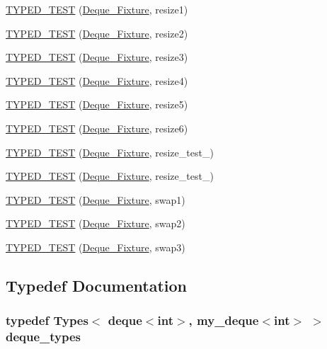 \begin{DoxyCompactItemize}
\item 
\hyperlink{TestDeque_8c_09_09_a4861cc7f4f1f2d8f90680487f8e4b6f4}{T\-Y\-P\-E\-D\-\_\-\-T\-E\-S\-T} (\hyperlink{structDeque__Fixture}{Deque\-\_\-\-Fixture}, resize1)
\item 
\hyperlink{TestDeque_8c_09_09_a4d1fd20f778de0be625788465b7ecbd3}{T\-Y\-P\-E\-D\-\_\-\-T\-E\-S\-T} (\hyperlink{structDeque__Fixture}{Deque\-\_\-\-Fixture}, resize2)
\item 
\hyperlink{TestDeque_8c_09_09_a43548d16dcb856e44d30ad9ebcefaa4f}{T\-Y\-P\-E\-D\-\_\-\-T\-E\-S\-T} (\hyperlink{structDeque__Fixture}{Deque\-\_\-\-Fixture}, resize3)
\item 
\hyperlink{TestDeque_8c_09_09_acef2b2b2ad033d418caca9d07a45c1ad}{T\-Y\-P\-E\-D\-\_\-\-T\-E\-S\-T} (\hyperlink{structDeque__Fixture}{Deque\-\_\-\-Fixture}, resize4)
\item 
\hyperlink{TestDeque_8c_09_09_a7db3e26540c8318a0c8e063def7848e7}{T\-Y\-P\-E\-D\-\_\-\-T\-E\-S\-T} (\hyperlink{structDeque__Fixture}{Deque\-\_\-\-Fixture}, resize5)
\item 
\hyperlink{TestDeque_8c_09_09_a636409bc2080e5b006d757a2e4959a3e}{T\-Y\-P\-E\-D\-\_\-\-T\-E\-S\-T} (\hyperlink{structDeque__Fixture}{Deque\-\_\-\-Fixture}, resize6)
\item 
\hyperlink{TestDeque_8c_09_09_a49393b148b2133863b6fd116f00868e7}{T\-Y\-P\-E\-D\-\_\-\-T\-E\-S\-T} (\hyperlink{structDeque__Fixture}{Deque\-\_\-\-Fixture}, resize\-\_\-test\-\_)
\item 
\hyperlink{TestDeque_8c_09_09_a75192a56be259b8bfb3b690f41015ac7}{T\-Y\-P\-E\-D\-\_\-\-T\-E\-S\-T} (\hyperlink{structDeque__Fixture}{Deque\-\_\-\-Fixture}, resize\-\_\-test\-\_)
\item 
\hyperlink{TestDeque_8c_09_09_a215253ea5c0cb1afcad6943cf7788c3e}{T\-Y\-P\-E\-D\-\_\-\-T\-E\-S\-T} (\hyperlink{structDeque__Fixture}{Deque\-\_\-\-Fixture}, swap1)
\item 
\hyperlink{TestDeque_8c_09_09_a899eb9ffe534295b28b0c274572def9e}{T\-Y\-P\-E\-D\-\_\-\-T\-E\-S\-T} (\hyperlink{structDeque__Fixture}{Deque\-\_\-\-Fixture}, swap2)
\item 
\hyperlink{TestDeque_8c_09_09_a7c7c3c95a8e8dede9f3e3e4e5edb8cc5}{T\-Y\-P\-E\-D\-\_\-\-T\-E\-S\-T} (\hyperlink{structDeque__Fixture}{Deque\-\_\-\-Fixture}, swap3)
\end{DoxyCompactItemize}


\subsection{Typedef Documentation}
\hypertarget{TestDeque_8c_09_09_ad1999e4b3126317baa06a1266daa323c}{
\subsubsection[{deque\-\_\-types}]{\setlength{\rightskip}{0pt plus 5cm}typedef Types$<$ deque$<$int$>$, {\bf my\-\_\-deque}$<$int$>$ $>$ {\bf deque\-\_\-types}}}\label{TestDeque_8c_09_09_ad1999e4b3126317baa06a1266daa323c}


